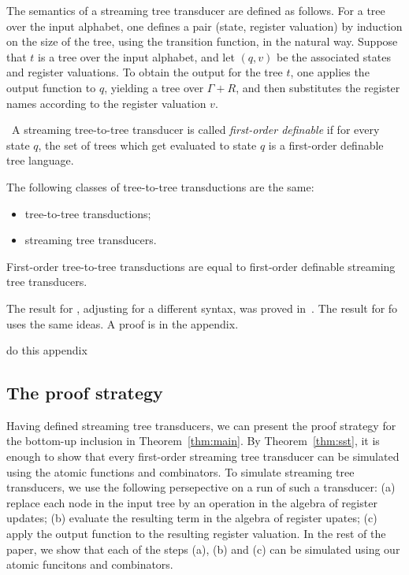 The semantics of a streaming tree transducer are defined as follows. For a tree over the input alphabet, one defines a pair (state, register valuation)
by induction on the size of the tree, using the transition function, in the natural way. Suppose that $t$  is a tree over the input alphabet, and let $(q,v)$ be the associated states and register  valuations. To obtain the output for the tree $t$, one applies the output function to $q$, yielding a tree over $\Gamma + R$, and then substitutes the register names according to the register valuation $v$. 


\begin{definition}\ 
    A streaming tree-to-tree transducer is called \emph{first-order definable} if for every state $q$, the set of trees which get evaluated to state $q$ is a first-order definable tree language.
\end{definition}    
\begin{theorem}\label{thm:sst}
    The following classes of tree-to-tree transductions are the same:
    \begin{itemize}
        \item  \mso tree-to-tree transductions;
        \item streaming tree transducers.
    \end{itemize}
    First-order  tree-to-tree transductions are equal to first-order definable streaming tree transducers.
\end{theorem}

The result for \mso, adjusting for a different syntax,  was proved in~\cite[Theorem 4.6]{alur2017streaming}. The result for fo uses the same ideas. A proof is in the appendix.
\begin{center}
    do this appendix 
\end{center}

\subsection{The proof strategy}
Having defined streaming tree transducers, we can present the proof strategy for the bottom-up inclusion in Theorem~\ref{thm:main}. By Theorem~\ref{thm:sst}, it is enough to show that every first-order streaming tree transducer can be simulated using the atomic functions and combinators. To simulate streaming tree transducers, we use the following persepective on a run of such a transducer: (a)  replace each node in the input tree by an operation in the algebra of register updates; (b) evaluate the resulting term in the algebra of register upates; (c) apply the output function to the resulting register valuation. In the rest of the paper, we show that each of the steps (a), (b) and (c) can be simulated using our atomic funcitons and combinators. 

